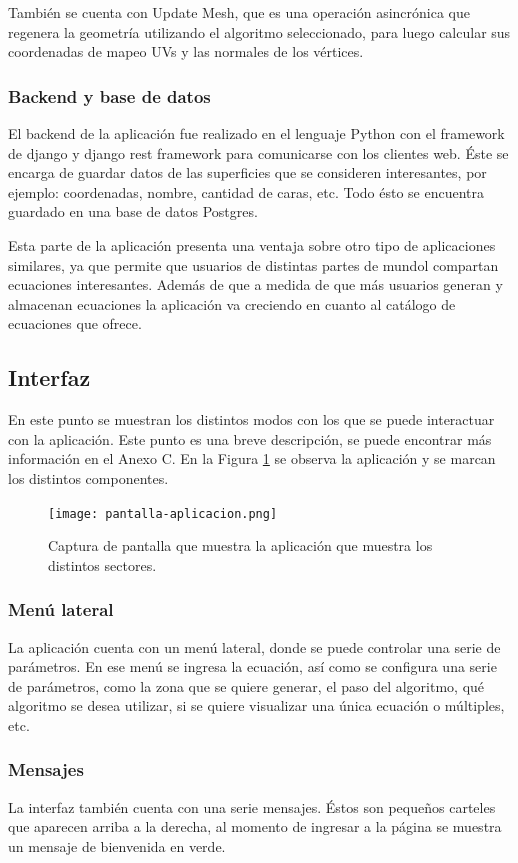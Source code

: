 \documentclass[12pt]{article}
\begin{document}
También se cuenta con Update Mesh, que es una operación asincrónica que regenera la geometría utilizando el algoritmo seleccionado, para luego calcular sus coordenadas de mapeo UVs y las normales de los vértices.
\subsubsection{Backend y base de datos}
El backend de la aplicación fue realizado en el lenguaje Python con el framework de django y django rest framework para comunicarse con los clientes web. Éste se encarga de guardar datos de las superficies que se consideren interesantes, por ejemplo: coordenadas, nombre, cantidad de caras, etc. Todo ésto se encuentra guardado en una base de datos Postgres.

Esta parte de la aplicación presenta una ventaja sobre otro tipo de aplicaciones similares, ya que permite que usuarios de distintas partes de mundol compartan ecuaciones interesantes. Además de que a medida de que más usuarios generan y almacenan ecuaciones la aplicación va creciendo en cuanto al catálogo de ecuaciones que ofrece.
\clearpage
\subsection{Interfaz}
En este punto se muestran los distintos modos con los que se puede interactuar con la aplicación. Este punto es una breve descripción, se puede encontrar más información en el Anexo C. En la Figura \ref{pantalla} se observa la aplicación y se marcan los distintos componentes.

\begin{figure}[h]
\texttt{[image: pantalla-aplicacion.png]}
\caption{Captura de pantalla que muestra la aplicación que muestra los distintos sectores.}
\label{pantalla}
\end{figure}

\subsubsection{Menú lateral}
La aplicación cuenta con un menú lateral, donde se puede controlar una serie de parámetros. En ese menú se ingresa la ecuación, así como se configura una serie de parámetros, como la zona que se quiere generar, el paso del algoritmo, qué algoritmo se desea utilizar, si se quiere visualizar una única ecuación o múltiples, etc. 
\subsubsection{Mensajes}
La interfaz también cuenta con una serie mensajes. Éstos son pequeños carteles que aparecen arriba a la derecha, al momento de ingresar a la página se muestra un mensaje de bienvenida en verde. 
\end{document}
